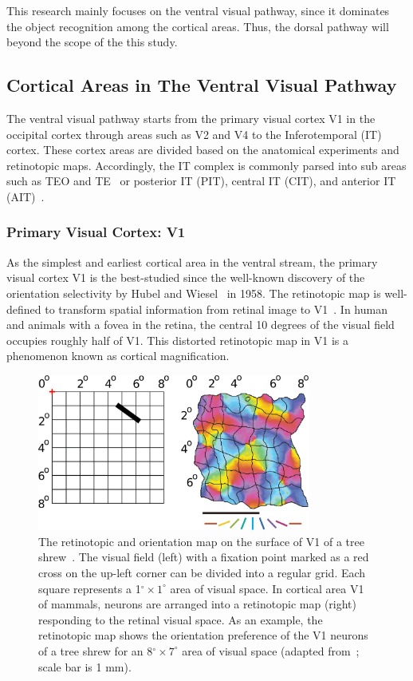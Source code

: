 This research mainly focuses on the ventral visual pathway, since it dominates the object recognition among the cortical areas.
Thus, the dorsal pathway will beyond the scope of the this study. 


\subsection{Cortical Areas in The Ventral Visual Pathway}
The ventral visual pathway starts from the primary visual cortex V1 in the occipital cortex through areas such as V2 and V4 to the Inferotemporal (IT) cortex.
These cortex areas are divided based on the anatomical experiments and retinotopic maps.
Accordingly, the IT complex is commonly parsed into sub areas such as TEO and TE~\cite{janssen2000selectivity,von1947neocortex} or posterior IT (PIT), central IT (CIT), and anterior IT (AIT)~\cite{felleman1991distributed}.
\subsubsection{Primary Visual Cortex: V1}
As the simplest and earliest cortical area in the ventral stream, the primary visual cortex V1 is the best-studied since the well-known discovery of the orientation selectivity by Hubel and Wiesel~\cite{hubel1959receptive} in 1958.
The retinotopic map is well-defined to transform spatial information from retinal image to V1~\cite{tootell1982deoxyglucose}.
In human and animals with a fovea in the retina, the central 10 degrees of the visual field occupies roughly half of V1.
This distorted retinotopic map in V1 is a phenomenon known as cortical magnification.

\begin{figure}
	\centering
	\includegraphics[width=0.8\textwidth]{pics_report/retinotopic.jpg}
	\caption{The retinotopic and orientation map on the surface of V1 of a tree shrew~\cite{bednar2009topographica}.
	The visual field (left) with a fixation point marked as a red cross on the up-left corner can be divided into a regular grid.
	Each square represents a 1$^\circ \times 1^\circ$ area of visual space.
	In cortical area V1 of mammals, neurons are arranged into a retinotopic map (right) responding to the retinal visual space.
	As an example, the retinotopic map shows the orientation preference of the V1 neurons of a tree shrew for an 8$^\circ \times 7^\circ$ area of visual space (adapted from~\cite{bosking2002spatial}; scale bar is 1 mm).}
	\label{Fig:retinotopic}
\end{figure}

